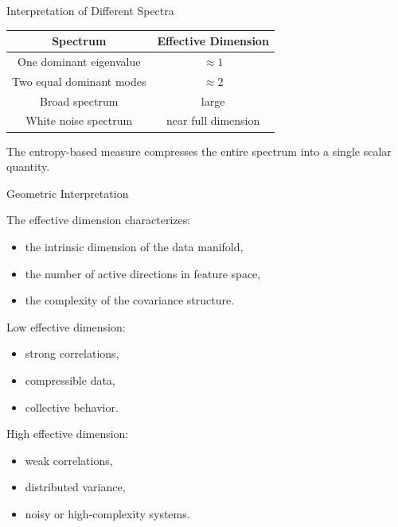 \documentclass{beamer}
\begin{document}
\begin{frame}{Interpretation of Different Spectra}

\begin{center}
\begin{tabular}{cc}
\toprule
Spectrum & Effective Dimension \\
\midrule
One dominant eigenvalue & $\approx 1$ \\
Two equal dominant modes & $\approx 2$ \\
Broad spectrum & large \\
White noise spectrum & near full dimension \\
\bottomrule
\end{tabular}
\end{center}

\vspace{0.5cm}

The entropy-based measure compresses the entire spectrum into a single scalar quantity.

\end{frame}

\begin{frame}{Geometric Interpretation}

The effective dimension characterizes:

\begin{itemize}
    \item the intrinsic dimension of the data manifold,
    \item the number of active directions in feature space,
    \item the complexity of the covariance structure.
\end{itemize}

\vspace{0.4cm}

Low effective dimension:

\begin{itemize}
    \item strong correlations,
    \item compressible data,
    \item collective behavior.
\end{itemize}

\vspace{0.4cm}

High effective dimension:

\begin{itemize}
    \item weak correlations,
    \item distributed variance,
    \item noisy or high-complexity systems.
\end{itemize}

\end{frame}
\end{document}
